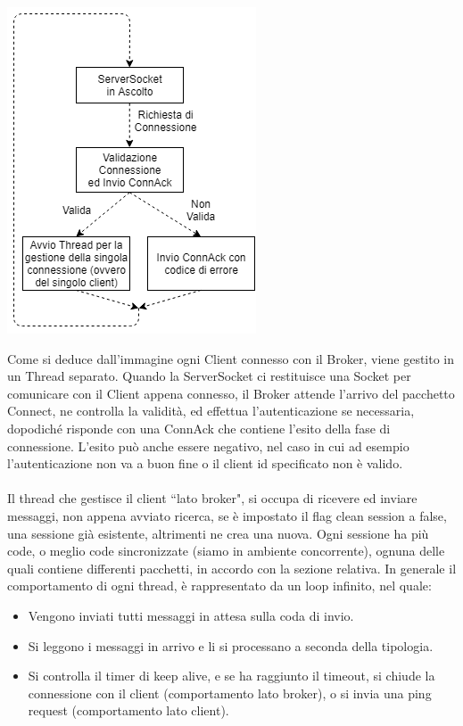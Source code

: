 \documentclass{article}
\begin{document}
\begin{center}
	\includegraphics[scale=0.6]{immagini/serversocket.png}
\end{center}
Come si deduce dall'immagine ogni Client connesso con il Broker, viene gestito in un Thread separato. Quando la ServerSocket ci restituisce una Socket per comunicare con il Client appena connesso, il Broker attende l'arrivo del pacchetto Connect, ne controlla la validità, ed effettua l'autenticazione se necessaria, dopodiché risponde con una ConnAck che contiene l'esito della fase di connessione. L'esito può anche essere negativo, nel caso in cui ad esempio l'autenticazione non va a buon fine o il client id specificato non è valido.\\\\
Il thread che gestisce il client ``lato broker", si occupa di ricevere ed inviare messaggi, non appena avviato ricerca, se è impostato il flag clean session a false, una sessione già esistente, altrimenti ne crea una nuova. Ogni sessione ha più code, o meglio code sincronizzate (siamo in ambiente concorrente), ognuna delle quali contiene differenti pacchetti, in accordo con la sezione relativa. In generale il comportamento di ogni thread, è rappresentato da un loop infinito, nel quale:
\begin{itemize}
	\item Vengono inviati tutti messaggi in attesa sulla coda di invio.
	\item Si leggono i messaggi in arrivo e li si processano a seconda della tipologia.
	\item Si controlla il timer di keep alive, e se ha raggiunto il timeout, si chiude la connessione con il client (comportamento lato broker), o si invia una ping request (comportamento lato client).
\end{itemize}
\end{document}
